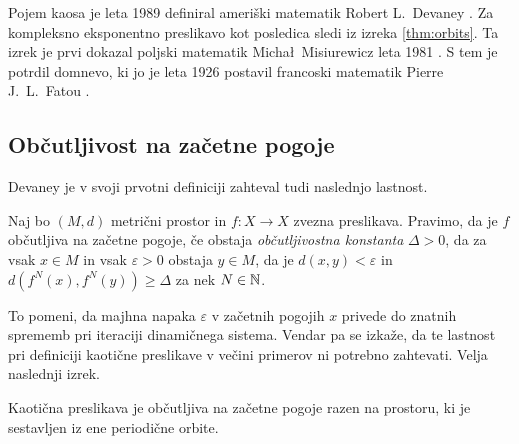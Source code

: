 \noindent Pojem kaosa je leta \num{1989} definiral ameriški matematik Robert L.~Devaney \cite{Devaney_1986}. Za kompleksno eksponentno preslikavo kot posledica sledi iz izreka  \ref{thm:orbits}. Ta izrek je prvi dokazal poljski matematik Micha\l\ Misiurewicz leta \num{1981} \cite{Misiurewicz_1981}. S tem je potrdil domnevo, ki jo je leta \num{1926} postavil francoski matematik Pierre J.~L.~Fatou \cite{Fatou_1926}.

\subsection{Občutljivost na začetne pogoje}

Devaney je v svoji prvotni definiciji zahteval tudi naslednjo lastnost.

\begin{definicija}
    Naj bo \((M, d)\) metrični prostor in \(f \colon X \to X\) zvezna preslikava. Pravimo, da je \(f\) občutljiva na začetne pogoje, če obstaja \emph{občutljivostna konstanta} \(\Delta > 0\), da za vsak \(x \in M\) in vsak \(\varepsilon > 0\) obstaja \(y \in M\), da je \(d (x, y) < \varepsilon\) in \(d (f^N (x), f^N (y)) \geq \Delta\) za nek \(N \in \mathbb N\).
\end{definicija}

\noindent To pomeni, da majhna napaka \(\varepsilon\) v začetnih pogojih \(x\) privede do znatnih sprememb pri iteraciji dinamičnega sistema. Vendar pa se izkaže, da te lastnost pri definiciji kaotične preslikave v večini primerov ni potrebno zahtevati. Velja naslednji izrek.

\begin{izrek}
    Kaotična preslikava je občutljiva na začetne pogoje razen na prostoru, ki je sestavljen iz ene periodične orbite.
\end{izrek}


